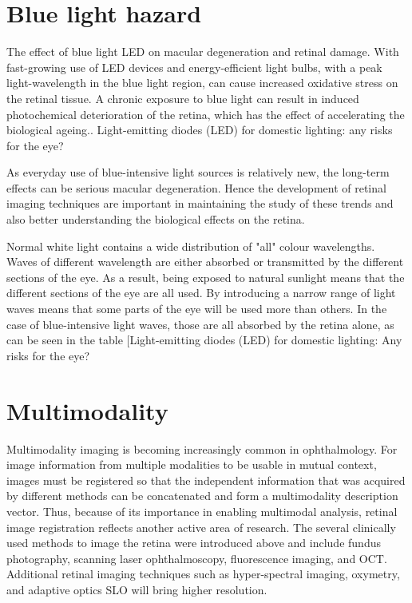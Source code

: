 \section{Blue light hazard}

The effect of blue light LED on macular degeneration and retinal
damage. With fast-growing use of LED devices and energy-efficient
light bulbs, with a peak light-wavelength in the blue light region,
can cause increased oxidative stress on the retinal tissue.\cite{}
A chronic exposure to blue light can result in induced photochemical
deterioration of the retina, which has the effect of accelerating the
biological ageing.\cite{}. Light-emitting diodes (LED)
for domestic lighting: any risks for the eye?\cite{}

As everyday use of blue-intensive light sources is relatively new,
the long-term effects can be serious macular degeneration. Hence the
development of retinal imaging techniques are important in maintaining
the study of these trends and also better understanding the biological
effects on the retina.
 
Normal white light contains a wide distribution of "all" colour
wavelengths. Waves of different wavelength are either absorbed or
transmitted by the different sections of the eye. As a result,
being exposed to natural sunlight means that the different sections
of the eye are all used. By introducing a narrow range of light waves
means that some parts of the eye will be used more than others. In the
case of blue-intensive light waves, those are all absorbed by the retina
alone, as can be seen in the table [Light-emitting diodes (LED) for
domestic lighting: Any risks for the eye?\cite{}

\section{Multimodality}

Multimodality imaging is becoming increasingly common in
ophthalmology. For image information from multiple modalities
to be usable in mutual context, images must be registered so
that the independent information that was acquired by different
methods can be concatenated and form a multimodality description
vector. Thus, because of its importance in enabling multimodal
analysis, retinal image registration reflects another active
area of research. The several clinically used methods to image
the retina were introduced above and include fundus photography,
scanning laser ophthalmoscopy, fluorescence imaging, and OCT.
Additional retinal imaging techniques such as hyper-spectral imaging,
oxymetry, and adaptive optics SLO will bring higher resolution.

